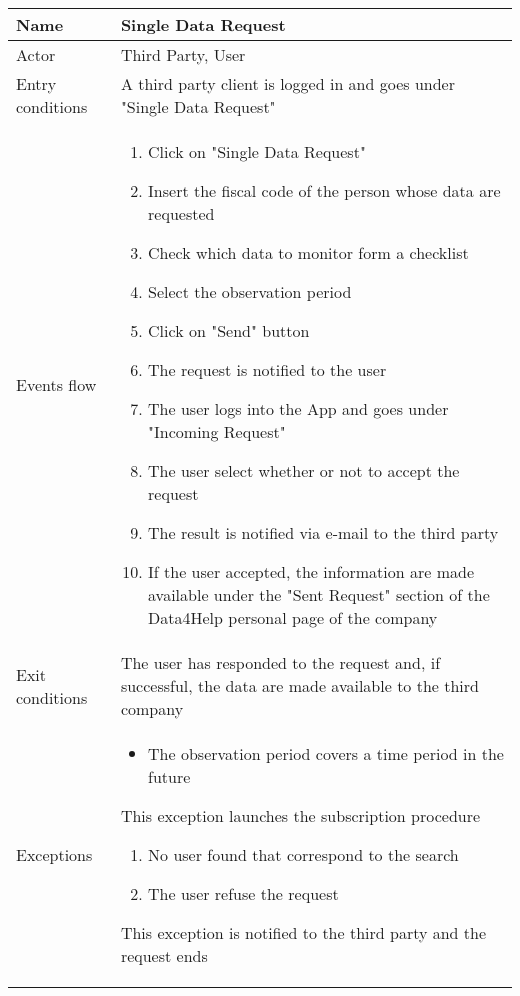 \begin{table}[]
\begin{tabular}{|l|p{12cm}|}
\hline
Name             & Single Data Request \\ \hline
Actor            & Third Party, User \\ \hline
Entry conditions & A third party client is logged in and goes under "Single Data Request"  \\ \hline
Events flow      & \begin{enumerate}
\item Click on "Single Data Request"
\item Insert the fiscal code of the person whose data are requested
\item Check which data to monitor form a checklist
\item Select the observation period
\item Click on "Send" button
\item The request is notified to the user
\item The user logs into the App and goes under "Incoming Request"
\item The user select whether or not to accept the request
\item The result is notified via e-mail to the third party
\item If the user accepted, the information are made available under the "Sent Request" section of the Data4Help personal page of the company
\end{enumerate} \\ \hline
Exit conditions  & The user has responded to the request and, if successful, the data are made available to the third company \\ \hline
Exceptions       & \begin{itemize}
\item The observation period covers a time period in the future
\end{itemize} This exception launches the subscription procedure
\begin{enumerate}
\item No user found that correspond to the search
\item The user refuse the request
\end{enumerate} This exception is notified to the third party and the request ends\\  \hline
\end{tabular}
\end{table}

